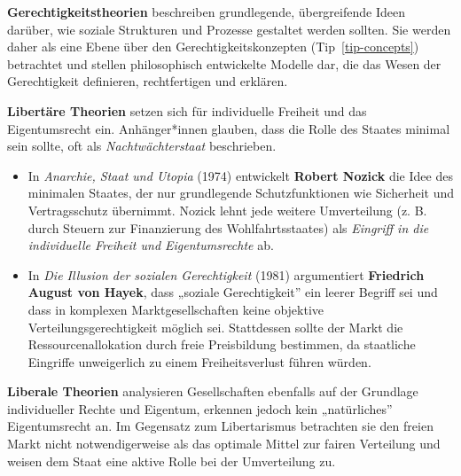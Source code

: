 \documentclass[
  nswissgerman,
  a4paper,
  DIV=11,
  numbers=noendperiod,
  oneside,
  openany]{scrreprt}
\newcounter{quartocallouttipno}
\newcommand{\quartocallouttip}[1]{\refstepcounter{quartocallouttipno}\label{#1}}
\begin{document}
\begin{tcolorbox}[enhanced jigsaw, arc=.35mm, bottomrule=.15mm, bottomtitle=1mm, breakable, colback=white, colbacktitle=quarto-callout-note-color!10!white, colframe=quarto-callout-note-color-frame, coltitle=black, left=2mm, leftrule=.75mm, opacityback=0, opacitybacktitle=0.6, rightrule=.15mm, title={Hinweis \ref*{tip-justice}: Gerechtigkeitstheorien}, titlerule=0mm, toprule=.15mm, toptitle=1mm]

\quartocallouttip{tip-justice} 

\textbf{Gerechtigkeitstheorien} beschreiben grundlegende, übergreifende
Ideen darüber, wie soziale Strukturen und Prozesse gestaltet werden
sollten. Sie werden daher als eine Ebene über den
Gerechtigkeitskonzepten (Tip~\ref{tip-concepts}) betrachtet und stellen
philosophisch entwickelte Modelle dar, die das Wesen der Gerechtigkeit
definieren, rechtfertigen und erklären.

\textbf{Libertäre Theorien} setzen sich für individuelle Freiheit und
das Eigentumsrecht ein. Anhänger*innen glauben, dass die Rolle des
Staates minimal sein sollte, oft als \emph{Nachtwächterstaat}
beschrieben.

\begin{itemize}
\item
  In \emph{Anarchie, Staat und Utopia} (1974) entwickelt \textbf{Robert
  Nozick} die Idee des minimalen Staates, der nur grundlegende
  Schutzfunktionen wie Sicherheit und Vertragsschutz übernimmt. Nozick
  lehnt jede weitere Umverteilung (z. B. durch Steuern zur Finanzierung
  des Wohlfahrtsstaates) als \emph{Eingriff in die individuelle Freiheit
  und Eigentumsrechte} ab.
\item
  In \emph{Die Illusion der sozialen Gerechtigkeit} (1981) argumentiert
  \textbf{Friedrich August von Hayek}, dass „soziale Gerechtigkeit'' ein
  leerer Begriff sei und dass in komplexen Marktgesellschaften keine
  objektive Verteilungsgerechtigkeit möglich sei. Stattdessen sollte der
  Markt die Ressourcenallokation durch freie Preisbildung bestimmen, da
  staatliche Eingriffe unweigerlich zu einem Freiheitsverlust führen
  würden.
\end{itemize}

\textbf{Liberale Theorien} analysieren Gesellschaften ebenfalls auf der
Grundlage individueller Rechte und Eigentum, erkennen jedoch kein
„natürliches'' Eigentumsrecht an. Im Gegensatz zum Libertarismus
betrachten sie den freien Markt nicht notwendigerweise als das optimale
Mittel zur fairen Verteilung und weisen dem Staat eine aktive Rolle bei
der Umverteilung zu.


\end{tcolorbox}
\end{document}
